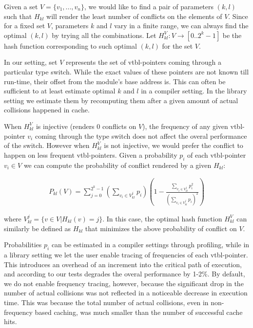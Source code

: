Given a set $V = \{v_1, ... , v_n\}$, we would like to find a pair of parameters 
$(k,l)$ such that $H_{kl}$ will render the least number of conflicts on the 
elements of $V$. Since for a fixed set $V$, parameters $k$ and $l$ vary in a 
finite range, we can always find the optimal $(k,l)$ by trying all the
combinations. Let $H_{kl}^V : V \rightarrow [0..2^k-1]$ be the hash function 
corresponding to such optimal $(k,l)$ for the set $V$. 

In our setting, set $V$ represents the set of vtbl-pointers coming through a 
particular type switch. While the exact values of these pointers are not known 
till run-time, their offset from the module's base address is. This can often be 
sufficient to at least estimate optimal $k$ and $l$ in a compiler setting. In 
the library setting we estimate them by recomputing them after a given amount of 
actual collisions happened in cache.

When $H_{kl}^V$ is injective (renders 0 conflicts on $V$), the frequency of any 
given vtbl-pointer $v_i$ coming through the type switch does not affect the 
overal performance of the switch. However when $H_{kl}^V$ is not injective, we 
would prefer the conflict to happen on less frequent vtbl-pointers.
Given a probability $p_i$ of each vtbl-pointer $v_i \in V$ we can compute the 
probability of conflict rendered by a given $H_{kl}$:

\begin{eqnarray*}
P_{kl}(V)=\sum\limits_{j=0}^{2^k-1}(\sum\limits_{v_{i} \in V^j_{kl}}p_{i})(1-\frac{\sum\limits_{v_i \in V^j_{kl}}p_i^2}{(\sum\limits_{v_{i} \in V^j_{kl}}p_{i})^2})
\end{eqnarray*}

\noindent 
where $V^j_{kl}=\{v \in V | H_{kl}(v)=j\}$. In this case, the optimal hash 
function $H_{kl}^V$ can similarly be defined as $H_{kl}$ that minimizes the 
above probability of conflict on $V$.

Probabilities $p_i$ can be estimated in a compiler settings through profiling, 
while in a library setting we let the user enable tracing of frequencies of 
each vtbl-pointer. This introduces an overhead of an increment into the critical 
path of execution, and according to our tests degrades the overal performance by 1-2\%. 
By default, we do not enable frequency tracing, however, because the significant 
drop in the number of actual collisions was not reflected in a noticeable 
decrease in execution time. This was because the total number of actual 
collisions, even in non-frequency based caching, was much smaller than the 
number of successful cache hits.

